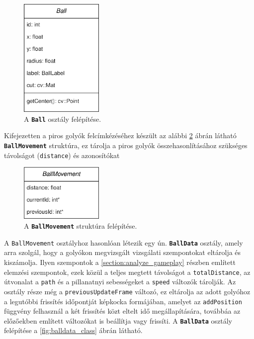 \begin{figure}[!ht]
    \centering
    \includegraphics[width=40mm, keepaspectratio]{figures/ball_class.png}
    \caption{A \textbf{\lstinline{Ball}} osztály felépítése.}
    \label{fig:ball_class}
\end{figure}

\par Kifejezetten a piros golyók felcímkézéséhez készült az alábbi \ref{fig:ballmovement_struct} ábrán látható \textbf{\lstinline{BallMovement}} struktúra, ez tárolja a piros golyók összehasonlításához szükséges távolságot (\lstinline{distance}) és azonosítókat 

\begin{figure}[!ht]
    \centering
    \includegraphics[width=40mm, keepaspectratio]{figures/ballmovement_class.png}
    \caption{A \textbf{\lstinline{BallMovement}} struktúra felépítése.}
    \label{fig:ballmovement_struct}
\end{figure}

\par A \lstinline{BallMovement} osztályhoz hasonlóan létezik egy ún. \textbf{\lstinline{BallData}} osztály, amely arra szolgál, hogy a golyókon megvizsgált vizsgálati szempontokat eltárolja és kiszámolja. Ilyen szempontok a \ref{section:analyze_gameplay} részben említett elemzési szempontok, ezek közül a teljes megtett távolságot a \lstinline{totalDistance}, az útvonalat a \lstinline{path} és a pillanatnyi sebességeket a \lstinline{speed} változók tárolják. Az osztály része még a \lstinline{previousUpdateFrame} változó, ez eltárolja az adott golyóhoz a legutóbbi frissítés időpontját képkocka formájában, amelyet az \lstinline{addPosition} függvény felhasznál a két frissítés közt eltelt idő megállapítására, továbbáa az előzőekben említett változókat is beállítja vagy frissíti. A \textbf{\lstinline{BallData}} osztály felépítése a \ref{fig:balldata_class} ábrán látható.


